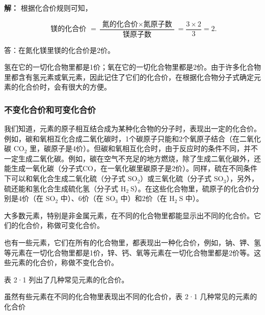 \textbf{解：} 根据化合价规则可知，

\[
\text{ 镁的化合价 } = \frac {\text{ 氮的化合价} \times \text{氮原子数 }}{\text{ 镁原子数 }} = \frac {3 \times 2}{3} = 2.
\]

答：在氮化镁里镁的化合价是2价。

氢在它的一切化合物里都是1价；氧在它的一切化合物里都是2价。由于许多化合物里都含有氢元素或氧元素，因此记住了它们的化合价，在根据化合物分子式确定元素的化合价时，会有很大的方便。

\subsubsection{不变化合价和可变化合价}

我们知道，元素的原子相互结合成为某种化合物的分子时，表现出一定的化合价。例如，碳和氧相互化合成二氧化碳时，1个碳原子只能和2个氧原子结合（在二氧化碳
\(\mathrm{CO}_{2}\)
里，碳原子是4价）。但碳和氧相互化合时，由于反应时的条件不同，并不一定生成二氧化碳。例如，碳在空气不充足的地方燃烧，除了生成二氧化碳外，还能生成一氧化碳（分子式CO，在一氧化碳里碳原子是2价）。同样，硫在不同条件下可以和氧化合生成二氧化硫（分子式
\(\mathrm{SO}_{2}\)）或三氧化硫（分子式
\(\mathrm{SO}_{3}\)），另外，硫还能和氢化合生成硫化氢（分子式
\(\mathrm{H}_{2} \mathrm{~S}\)）。在这些化合物里，硫原子的化合价分别是4价（在
\(\mathrm{SO}_{2}\) 中）、6价（在 \(\mathrm{SO}_{3}\) 中）和2价（在
\(\mathrm{H}_{2} \mathrm{~S}\) 中）。

大多数元素，特别是非金属元素，在不同的化合物里都能显示出不同的化合价。它们的化合价，称做可变化合价。

也有一些元素，它们在所有的化合物里，都表现出一种化合价，例如，钠、钾、氢等元素在一切化合物里都是1价，锌、钙、氧等元素在一切化合物里都是2价等。这些元素的化合价，称做不变化合价。

表 2·1 列出了几种常见元素的化合价。

虽然有些元素在不同的化合物里表现出不同的化合价，表 2·1
几种常见的元素的化合价

{\centering
\small\setlength{\tabcolsep}{3pt}%
\par
}

